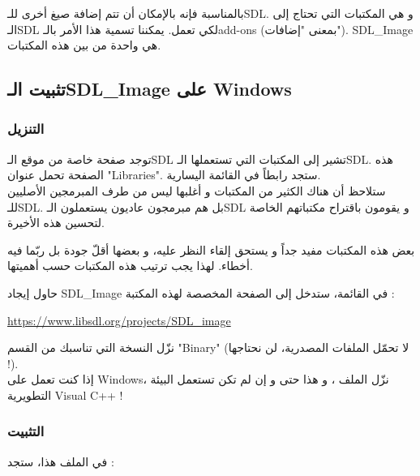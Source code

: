 بالمناسبة فإنه بالإمكان أن تتم إضافة صيغ أخرى للـ\textenglish{SDL}.
و هي المكتبات التي تحتاج إلى الـ\textenglish{SDL}
لكي تعمل. يمكننا تسمية هذا الأمر بالـ\textenglish{add-ons}
(بمعنى "إضافات").
\textenglish{SDL\_Image}
هي واحدة من بين هذه المكتبات.

\subsection{تثبيت الـ\textenglish{SDL\_Image} على \textenglish{Windows}}

\subsubsection{التنزيل}

توجد صفحة خاصة من موقع الـ\textenglish{SDL}
تشير إلى المكتبات التي تستعملها الـ\textenglish{SDL}.
هذه الصفحة تحمل عنوان
"\textenglish{Libraries}".
ستجد رابطاً في القائمة اليسارية.\\
ستلاحظ أن هناك الكثير من المكتبات و أغلبها ليس من طرف المبرمجين الأصليين للـ\textenglish{SDL}.
بل هم مبرمجون عاديون يستعملون الـ\textenglish{SDL}
و يقومون باقتراح مكتباتهم الخاصة لتحسين هذه الأخيرة.

بعض هذه المكتبات مفيد جداً و يستحق إلقاء النظر عليه، و بعضها أقلّ جودة بل ربّما فيه أخطاء. لهذا يجب ترتيب هذه المكتبات حسب أهميتها.

حاول إيجاد
\textenglish{SDL\_Image}
في القائمة، ستدخل إلى الصفحة المخصصة لهذه المكتبة :

\url{https://www.libsdl.org/projects/SDL_image}

نزّل النسخة التي تناسبك من القسم
"\textenglish{Binary}"
(لا تحمّل الملفات المصدرية، لن نحتاجها !).\\
إذا كنت تعمل على
\textenglish{Windows}،
نزّل الملف
،
و هذا حتى و إن لم تكن تستعمل البيئة التطويرية 
\textenglish{Visual C++} !

\subsubsection{التثبيت}

في الملف
هذا، ستجد :

